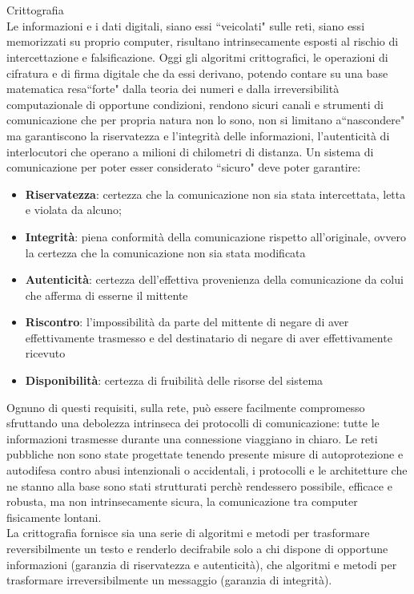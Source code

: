 \documentclass[a4paper,12pt]{tesiinfo}
\begin{document}
\\
\\
Crittografia
\\
Le informazioni e i dati digitali, siano essi ``veicolati" sulle reti, siano essi memorizzati su proprio computer, risultano intrinsecamente esposti al rischio di intercettazione e falsificazione. Oggi gli algoritmi crittografici, le operazioni di cifratura e di firma digitale che da essi derivano, potendo contare su una base matematica resa``forte" dalla teoria dei numeri e dalla irreversibilit\`a computazionale di opportune condizioni, rendono sicuri canali e strumenti di comunicazione che per propria natura non lo sono, non si limitano a``nascondere" ma garantiscono la riservatezza e l'integrit\`a delle informazioni, l'autenticit\`a di interlocutori che operano a milioni di chilometri di distanza. 
Un sistema di comunicazione per poter esser considerato ``sicuro" deve poter garantire:
 \begin{itemize}
     \item \textbf{Riservatezza}: certezza che la comunicazione non sia stata intercettata, letta e violata da alcuno;
     \item \textbf{Integrit\`a}: piena conformit\`a della comunicazione rispetto all'originale, ovvero la certezza che la comunicazione non sia stata modificata
     \item \textbf{Autenticit\`a}: certezza dell'effettiva provenienza della comunicazione da colui che afferma di esserne il mittente
     \item \textbf{Riscontro}: l'impossibilit\`a da parte del mittente di negare di aver effettivamente trasmesso e del destinatario di negare di aver effettivamente ricevuto
     \item \textbf{Disponibilit\`a}: certezza di fruibilit\`a delle risorse del sistema
 \end{itemize}
Ognuno di questi requisiti, sulla rete, pu\`o essere facilmente compromesso sfruttando una debolezza intrinseca dei protocolli di comunicazione: tutte le informazioni trasmesse durante una connessione viaggiano in chiaro. Le reti pubbliche non sono state progettate tenendo presente misure di autoprotezione e autodifesa contro abusi intenzionali o accidentali, i protocolli e le architetture che ne stanno alla base sono stati strutturati perch\`e rendessero possibile, efficace e robusta, ma non intrinsecamente sicura, la comunicazione tra computer fisicamente lontani. 
\\
La crittografia fornisce sia una serie di algoritmi e metodi per trasformare reversibilmente un testo e renderlo decifrabile solo a chi dispone di opportune informazioni (garanzia di riservatezza e autenticit\`a), che algoritmi e metodi per trasformare irreversibilmente un messaggio (garanzia di integrit\`a). 
\end{document}
